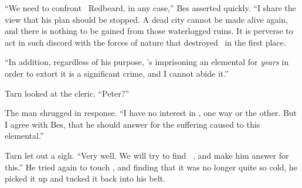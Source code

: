 ``We need to confront \mothzam\ Redbeard, in any case,'' Bes asserted quickly.  ``I share the view that his plan should be stopped.  A dead city cannot be made alive again, and there is nothing to be gained from those waterlogged ruins.  It is perverse to act in such discord with the forces of nature that destroyed \atmudarant\ in the first place.

``In addition, regardless of his purpose, \mothzam's imprisoning an elemental for \emph{years} in order to extort it is a significant crime, and I cannot abide it.''

Tarn looked at the cleric.  ``Peter?''

The man shrugged in response.  ``I have no interest in \atmudarant, one way or the other.  But I agree with Bes, that he should answer for the suffering caused to this elemental.''

Tarn let out a sigh.  ``Very well.  We will try to find \mothzam\ \driktur, and make him answer for this.''  He tried again to touch \kildir, and finding that it was no longer quite so cold, he picked it up and tucked it back into his belt.

